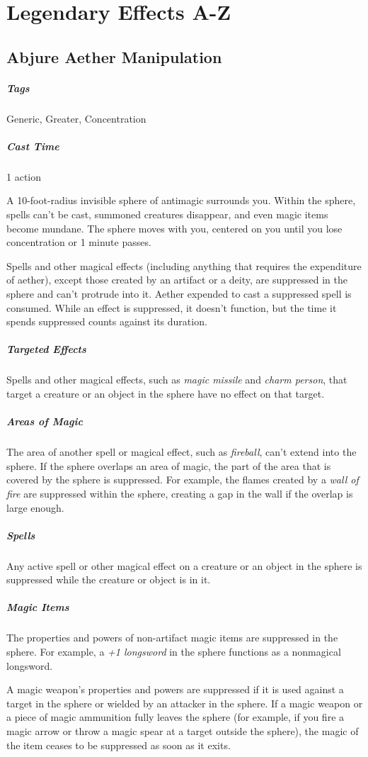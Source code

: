 \section{Legendary Effects A-Z}
\subsection{Abjure Aether Manipulation}
\label{spell:abjure-aether-manipulation}
\subparagraph*{Tags} Generic, Greater, Concentration
\subparagraph*{Cast Time} 1 action

A 10-foot-radius invisible sphere of antimagic surrounds you. Within the sphere, spells can't be cast, summoned creatures disappear, and even magic items become mundane. The sphere moves with you, centered on you until you lose concentration or 1 minute passes.

Spells and other magical effects (including anything that requires the expenditure of aether), except those created by an artifact or a deity, are suppressed in the sphere and can't protrude into it. Aether expended to cast a suppressed spell is consumed. While an effect is suppressed, it doesn't function, but the time it spends suppressed counts against its duration.

\subparagraph*{Targeted Effects} Spells and other magical effects, such as \textit{magic missile} and \textit{charm person}, that target a creature or an object in the sphere have no effect on that target.

\subparagraph*{Areas of Magic} The area of another spell or magical effect, such as \textit{fireball}, can't extend into the sphere. If the sphere overlaps an area of magic, the part of the area that is covered by the sphere is suppressed. For example, the flames created by a \textit{wall of fire} are suppressed within the sphere, creating a gap in the wall if the overlap is large enough.

\subparagraph*{Spells} Any active spell or other magical effect on a creature or an object in the sphere is suppressed while the creature or object is in it.

\subparagraph*{Magic Items} The properties and powers of non-artifact magic items are suppressed in the sphere. For example, a \textit{+1 longsword} in the sphere functions as a nonmagical longsword.

A magic weapon's properties and powers are suppressed if it is used against a target in the sphere or wielded by an attacker in the sphere. If a magic weapon or a piece of magic ammunition fully leaves the sphere (for example, if you fire a magic arrow or throw a magic spear at a target outside the sphere), the magic of the item ceases to be suppressed as soon as it exits.


